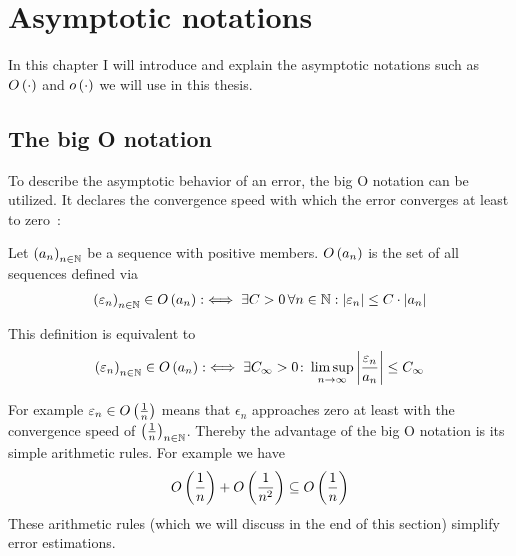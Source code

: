 \chapter{Asymptotic notations} \label{chapter:tools}

In this chapter I will introduce and explain the asymptotic notations such as $O\left( {\cdot} \right)$ and $o\left( {\cdot} \right)$ we will use in this thesis.

\section{The big O notation}

To describe the asymptotic behavior of an error, the big O notation can be utilized. It declares the convergence speed with which the error converges at least to zero~\cite[p. 444]{graham}\cite[p.~100]{aigner}:

\begin{definition}
  Let $\left({a_n}\right)_{{n}\in\mathbb N}$ be a sequence with positive members. $O\left( {a_n} \right)$ is the set of all sequences defined via
  \begin{align} \label{bigo_def1}
    \left({\varepsilon_n}\right)_{{n}\in\mathbb N} \in O\left( {a_n} \right) :\iff \exists C > 0\, \forall n\in \mathbb N: \left|{\varepsilon_n}\right| \le C \cdot \left|{a_n}\right|
  \end{align}
\end{definition}

\noindent This definition is equivalent to~\cite[p.~383]{hachenberger}\cite{wiki:bigo}
\begin{align} \label{bigo_def_limsup}
  \left({\varepsilon_n}\right)_{{n}\in\mathbb N} \in O\left( {a_n} \right) :\iff \exists C_\infty > 0 \colon\limsup_{n\to\infty} \left|{\frac{\varepsilon_n}{a_n}}\right| \le C_\infty
\end{align}

For example $\varepsilon_n \in O\left( {\frac 1n} \right)$ means that $\epsilon_n$ approaches zero at least with the convergence speed of $\left({\frac 1n}\right)_{{n}\in\mathbb N}$. Thereby the advantage of the big O notation is its simple arithmetic rules. For example we have
\begin{align}
  O\left( {\frac 1n} \right) + O\left( {\frac 1{n^2}} \right) \subseteq O\left( {\frac 1n} \right)
\end{align}
These arithmetic rules (which we will discuss in the end of this section) simplify error estimations.

